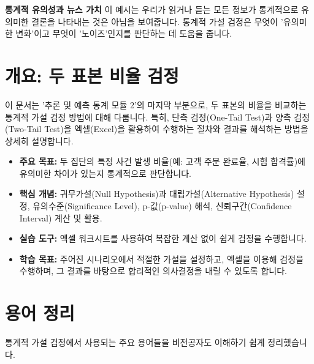 \documentclass[11pt,a4paper]{article}
\begin{document}
\begin{warningbox}
\textbf{통계적 유의성과 뉴스 가치}
이 예시는 우리가 읽거나 듣는 모든 정보가 통계적으로 유의미한 결론을 나타내는 것은 아님을 보여줍니다. 통계적 가설 검정은 무엇이 '유의미한 변화'이고 무엇이 '노이즈'인지를 판단하는 데 도움을 줍니다.
\end{warningbox}

\newpage

\newpage
\section*{개요: 두 표본 비율 검정}

이 문서는 '추론 및 예측 통계 모듈 2'의 마지막 부분으로, 두 표본의 비율을 비교하는 통계적 가설 검정 방법에 대해 다룹니다. 특히, 단측 검정(One-Tail Test)과 양측 검정(Two-Tail Test)을 엑셀(Excel)을 활용하여 수행하는 절차와 결과를 해석하는 방법을 상세히 설명합니다.

\begin{itemize}
    \item \textbf{주요 목표:} 두 집단의 특정 사건 발생 비율(예: 고객 주문 완료율, 시험 합격률)에 유의미한 차이가 있는지 통계적으로 판단합니다.
    \item \textbf{핵심 개념:} 귀무가설(Null Hypothesis)과 대립가설(Alternative Hypothesis) 설정, 유의수준(Significance Level), p-값(p-value) 해석, 신뢰구간(Confidence Interval) 계산 및 활용.
    \item \textbf{실습 도구:} 엑셀 워크시트를 사용하여 복잡한 계산 없이 쉽게 검정을 수행합니다.
    \item \textbf{학습 목표:} 주어진 시나리오에서 적절한 가설을 설정하고, 엑셀을 이용해 검정을 수행하며, 그 결과를 바탕으로 합리적인 의사결정을 내릴 수 있도록 합니다.
\end{itemize}

\newpage
\section*{용어 정리}

통계적 가설 검정에서 사용되는 주요 용어들을 비전공자도 이해하기 쉽게 정리했습니다.
\end{document}
